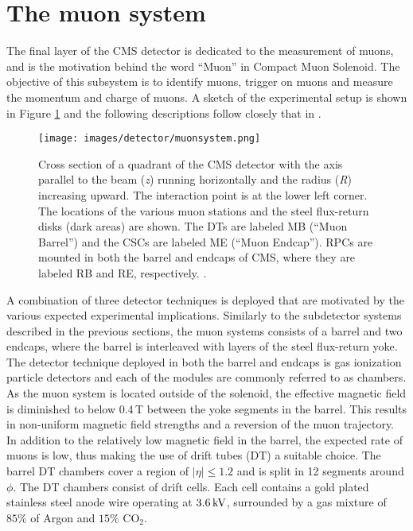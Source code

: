 \section{The muon system}\label{sec:muonsystem}
\noindent\justify
The final layer of the CMS detector is dedicated to the measurement of muons, and is the motivation behind the word ``Muon'' in Compact Muon Solenoid. 
The objective of this subsystem is to identify muons, trigger on muons and measure the momentum and charge of muons. 
A sketch of the experimental setup is shown in Figure \ref{fig:Muon} and the following descriptions follow closely that in \cite{Chatrchyan:2012xi}. 
\begin{figure}[!htp]
  \centering
   \texttt{[image: images/detector/muonsystem.png]}
   \caption{Cross section of a quadrant of the CMS detector with the axis parallel to the beam (\textit{z}) running horizontally and the radius (\textit{R}) increasing upward. The interaction point is at the lower left corner. The locations of the various muon stations and the steel flux-return disks (dark areas) are shown. The DTs are labeled MB (``Muon Barrel'') and the CSCs are labeled ME (``Muon Endcap''). RPCs are mounted in both the barrel and endcaps of CMS, where they are labeled RB and RE, respectively. \cite{Chatrchyan:2012xi}.}
   \label{fig:Muon}
\end{figure}                                                                                            
A combination of three detector techniques is deployed that are motivated by the various expected experimental implications. 
Similarly to the subdetector systems described in the previous sections, the muon systems consists of a barrel and two endcaps, where the barrel is interleaved with layers of the steel flux-return yoke. 
\newpara
\noindent\justify
The detector technique deployed in both the barrel and endcaps is gas ionization particle detectors and each of the modules are commonly referred to as chambers. 
As the muon system is located outside of the solenoid, the effective magnetic field is diminished to below 0.4$\,$T between the yoke segments in the barrel. 
This results in non-uniform magnetic field strengths and a reversion of the muon trajectory. 
In addition to the relatively low magnetic field in the barrel, the expected rate of muons is low, thus making the use of drift tubes (DT) a suitable choice. 
The barrel DT chambers cover a region of $|\eta|\leq1.2$ and is split in 12 segments around $\phi$. 
The DT chambers consist of drift cells. 
Each cell contains a gold plated stainless steel anode wire operating at $3.6\,\text{k\hspace{-.08em}V}$, surrounded by a gas mixture of $85\%$ of Argon and $15\%$ $\mathrm{CO_{2}}$. 
